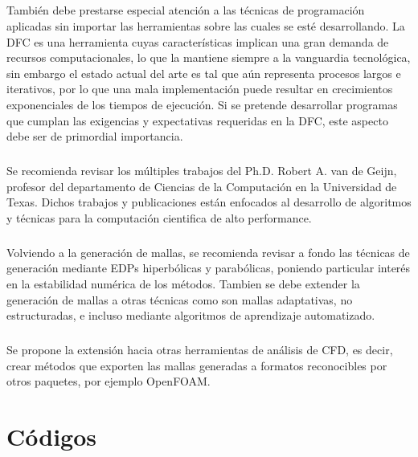 \documentclass[letterpaper, openright, 12pt]{book}
\begin{document}
\paragraph*{}
    También debe prestarse especial atención a las técnicas de programación
    aplicadas sin importar las herramientas sobre las cuales se esté
    desarrollando. La DFC es una herramienta cuyas características implican una
    gran demanda de recursos computacionales, lo que la mantiene siempre a la
    vanguardia tecnológica, sin embargo el estado actual del arte es tal que
    aún representa procesos largos e iterativos, por lo que una mala
    implementación puede resultar en crecimientos exponenciales de los tiempos
    de ejecución. Si se pretende desarrollar programas que cumplan las
    exigencias y expectativas requeridas en la DFC, este aspecto debe ser de
    primordial importancia.

\paragraph*{}
    Se recomienda revisar los múltiples trabajos del Ph.D. Robert A. van de
    Geijn, profesor del departamento de Ciencias de la Computación en la
    Universidad de Texas. Dichos trabajos y publicaciones están enfocados al
    desarrollo de algoritmos y técnicas para la computación cientifica de alto
    performance.

\paragraph*{}
    Volviendo a la generación de mallas, se recomienda revisar a fondo las
    técnicas de generación mediante EDPs hiperbólicas y parabólicas, poniendo
    particular interés en la estabilidad numérica de los métodos. Tambien se
    debe extender la generación de mallas a otras técnicas como son mallas
    adaptativas, no estructuradas, e incluso mediante algoritmos de aprendizaje
    automatizado.

\paragraph*{}
    Se propone la extensión hacia otras herramientas de análisis de CFD, es
    decir, crear métodos que exporten las mallas generadas a formatos
    reconocibles por otros paquetes, por ejemplo OpenFOAM\@.

%
%
%
%
%

%
%
%
%
%
\appendix
\chapter{Códigos}\label{appCode}
\end{document}
